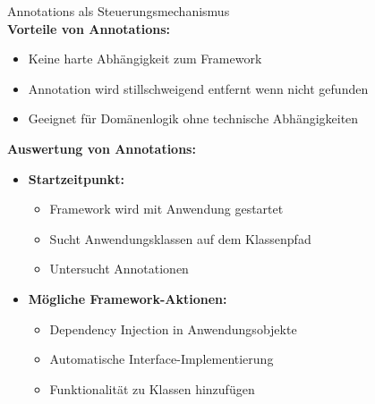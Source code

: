 \begin{concept}{Annotations als Steuerungsmechanismus}\\
\textbf{Vorteile von Annotations:}
\begin{itemize}
    \item Keine harte Abhängigkeit zum Framework
    \item Annotation wird stillschweigend entfernt wenn nicht gefunden
    \item Geeignet für Domänenlogik ohne technische Abhängigkeiten
\end{itemize}

\textbf{Auswertung von Annotations:}
\begin{itemize}
    \item \textbf{Startzeitpunkt:}
    \begin{itemize}
        \item Framework wird mit Anwendung gestartet
        \item Sucht Anwendungsklassen auf dem Klassenpfad
        \item Untersucht Annotationen
    \end{itemize}
    \item \textbf{Mögliche Framework-Aktionen:}
    \begin{itemize}
        \item Dependency Injection in Anwendungsobjekte
        \item Automatische Interface-Implementierung
        \item Funktionalität zu Klassen hinzufügen
    \end{itemize}
\end{itemize}
\end{concept}


